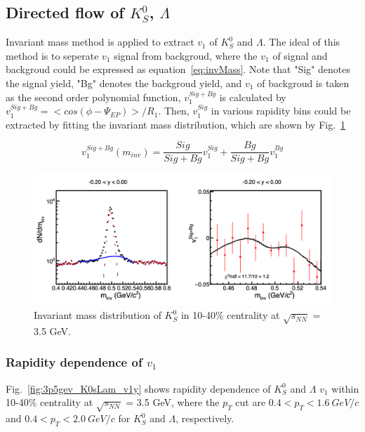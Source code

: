 \subsection{Directed flow of $K^{0}_{S}$, $\Lambda$}

Invariant mass method is applied to extract $v_1$ of $K^{0}_{S}$ and $\Lambda$. 
The ideal of this method is to seperate $v_1$ signal from backgroud, where the $v_1$ of signal and backgroud could be expressed as equation~\ref{eq:invMass}.
Note that "Sig" denotes the signal yield, "Bg" denotes the backgroud yield, 
and $v_1$ of backgroud is taken as the second order polynomial function, 
$v_1^{Sig+Bg}$ is calculated by $v_1^{Sig+Bg} = <cos(\phi-\Psi_{EP})>/R_1$.
Then, $v_1^{Sig}$ in various rapidity bins could be extracted by fitting the invariant mass distribution,
which are shown by Fig.~\ref{fig:3p5gev_K0s_invMass}


\begin{equation}
v_1^{S i g+B g}\left(m_{i n v}\right)=\frac{S i g}{S i g+B g} v_1^{S i g}+\frac{B g}{S i g+B g} v_1^{B g}
\label{eq:invMass}
\end{equation}

\begin{figure}[hbt!]
\centering
\includegraphics[width=0.85\linewidth]{figures/chapter03/3p5gev_K0s_invMass.png}
\caption{Invariant mass distribution of $K_S^0$ in 10-40\% centrality at $\sqrt{s_{NN}}$ = 3.5 GeV.}
\label{fig:3p5gev_K0s_invMass}
\end{figure}

\subsubsection{Rapidity dependence of $v_1$}

Fig.~\ref{fig:3p5gev_K0sLam_v1y} shows rapidity dependence of $K^0_S$ and $\Lambda$ $v_1$ within 10-40\% centrality at $\sqrt{s_{NN}}$ = 3.5 GeV,
where the $p_T$ cut are $0.4 < p_T < 1.6~GeV/c$ and $0.4 < p_T < 2.0~GeV/c$ for $K^0_S$ and $\Lambda$, respectively. 

